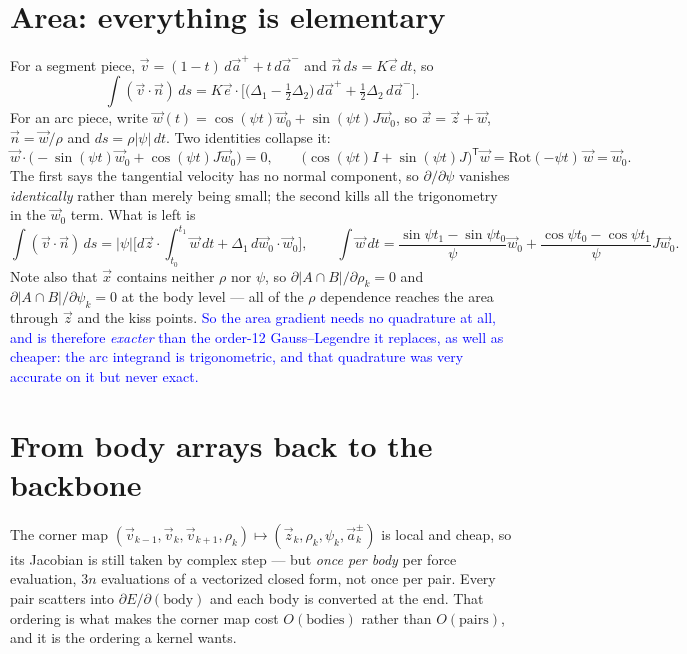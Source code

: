 \documentclass[11pt]{article}
\newcommand{\vv}[1]{\vec{#1}}
\newcommand{\note}[1]{\textcolor{blue}{#1}}
\begin{document}
\section{Area: everything is elementary}

For a segment piece, $\vv v=(1-t)\,d\vv a^+ + t\,d\vv a^-$ and $\vv n\,ds=K\vv e\,dt$, so
\begin{equation}
  \int(\vv v\cdot\vv n)\,ds
  = K\vv e\cdot\Big[\big(\Delta_1-\tfrac12\Delta_2\big)\,d\vv a^+ +\tfrac12\Delta_2\,d\vv a^-\Big].
\end{equation}
For an arc piece, write $\vv w(t)=\cos(\psi t)\vv w_0+\sin(\psi t)J\vv w_0$, so
$\vv x=\vv z+\vv w$, $\vv n=\vv w/\rho$ and $ds=\rho|\psi|\,dt$. Two identities collapse it:
\begin{equation}
  \vv w\cdot\big(-\sin(\psi t)\vv w_0+\cos(\psi t)J\vv w_0\big)=0,
  \qquad
  \big(\cos(\psi t)I+\sin(\psi t)J\big)^{\mathsf T}\vv w=\mathrm{Rot}(-\psi t)\,\vv w=\vv w_0 .
\end{equation}
The first says the tangential velocity has no normal component, so $\partial/\partial\psi$ vanishes
\emph{identically} rather than merely being small; the second kills all the trigonometry in the
$\vv w_0$ term. What is left is
\begin{equation}
  \int(\vv v\cdot\vv n)\,ds
  = |\psi|\Big[d\vv z\cdot\!\int_{t_0}^{t_1}\!\!\vv w\,dt+\Delta_1\,d\vv w_0\cdot\vv w_0\Big],
  \qquad
  \int\vv w\,dt=\frac{\sin\psi t_1-\sin\psi t_0}{\psi}\vv w_0+\frac{\cos\psi t_0-\cos\psi t_1}{\psi}J\vv w_0 .
\end{equation}
Note also that $\vv x$ contains neither $\rho$ nor $\psi$, so $\partial|A\cap B|/\partial\rho_k=0$ and
$\partial|A\cap B|/\partial\psi_k=0$ at the body level --- all of the $\rho$ dependence reaches the
area through $\vv z$ and the kiss points. \note{So the area gradient needs no quadrature at all, and
is therefore \emph{exacter} than the order-12 Gauss--Legendre it replaces, as well as cheaper: the arc
integrand is trigonometric, and that quadrature was very accurate on it but never exact.}

\section{From body arrays back to the backbone}

The corner map $(\vv v_{k-1},\vv v_k,\vv v_{k+1},\rho_k)\mapsto(\vv z_k,\rho_k,\psi_k,\vv a^\pm_k)$ is
local and cheap, so its Jacobian is still taken by complex step --- but \emph{once per body} per force
evaluation, $3n$ evaluations of a vectorized closed form, not once per pair. Every pair scatters into
$\partial E/\partial(\text{body})$ and each body is converted at the end. That ordering is what makes
the corner map cost $O(\text{bodies})$ rather than $O(\text{pairs})$, and it is the ordering a kernel
wants.
\end{document}

